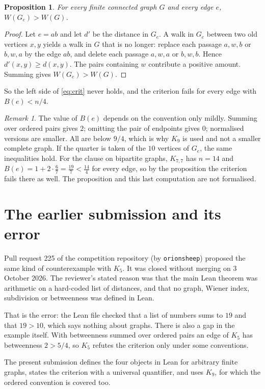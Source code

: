 \documentclass[11pt]{article}
\newtheorem{proposition}[theorem]{Proposition}
\theoremstyle{remark}
\newtheorem*{remark}{Remark}
\begin{document}
\begin{proposition}
For every finite connected graph $G$ and every edge $e$,
$W(G_e)>W(G)$.
\end{proposition}
\begin{proof}
Let $e=ab$ and let $d'$ be the distance in $G_e$. A walk in $G_e$
between two old vertices $x,y$ yields a walk in $G$ that is no longer:
replace each passage $a,w,b$ or $b,w,a$ by the edge $ab$, and delete
each passage $a,w,a$ or $b,w,b$. Hence $d'(x,y)\ge d(x,y)$. The pairs
containing $w$ contribute a positive amount. Summing gives
$W(G_e)>W(G)$.
\end{proof}

So the left side of \eqref{eq:crit} never holds, and the criterion fails
for every edge with $B(e)<n/4$.

\begin{remark}
The value of $B(e)$ depends on the convention only mildly. Summing over
ordered pairs gives $2$; omitting the pair of endpoints gives $0$;
normalised versions are smaller. All are below $9/4$, which is why
$K_9$ is used and not a smaller complete graph. If the quarter is taken
of the $10$ vertices of $G_e$, the same inequalities hold. For the
clause on bipartite graphs, $K_{7,7}$ has $n=14$ and
$B(e)=1+2\cdot\tfrac67=\tfrac{19}7<\tfrac{14}4$ for every edge, so by
the proposition the criterion fails there as well. The proposition and
this last computation are not formalised.
\end{remark}

\section*{The earlier submission and its error}
Pull request 225 of the competition repository (by
\texttt{orionsheep}) proposed the same kind of counterexample with
$K_5$. It was closed without merging on 3 October 2026. The reviewer's
stated reason was that the main Lean theorem was arithmetic on a
hard-coded list of distances, and that no graph, Wiener index,
subdivision or betweenness was defined in Lean.

That is the error: the Lean file checked that a list of numbers sums to
$19$ and that $19>10$, which says nothing about graphs. There is also a
gap in the example itself. With betweenness summed over ordered pairs
an edge of $K_5$ has betweenness $2>5/4$, so $K_5$ refutes the
criterion only under some conventions.

The present submission defines the four objects in Lean for arbitrary
finite graphs, states the criterion with a universal quantifier, and
uses $K_9$, for which the ordered convention is covered too.
\end{document}
